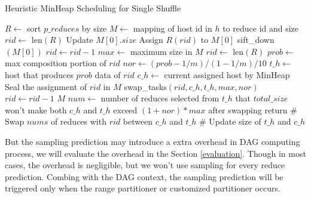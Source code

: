\begin{minipage}{\linewidth}
\begin{algorithm}[H]
\caption{Heuristic MinHeap Scheduling for Single Shuffle}
\label{hminheap}
	\begin{algorithmic}[1]
	\small
		\State $R\gets$ sort $p\_reduces$ by size
		\State $M\gets$ mapping of host id in $h$ to reduce id and size
		\State $rid\gets$ len$\left(R\right)$
		\State Update $M\left[0\right].size$
		\State Assign $R\left(rid\right)$ to $M\left[0\right]$
		\State sift\_down$\left(M\left[0\right]\right)$
		\State
		\State $rid\gets rid-1$
		\EndWhile
		\State $max\gets$ maximum size in $M$
		\State $rid\gets$ len$\left(R\right)$
		\State $prob\gets$ max composition portion of $rid$
		\State $nor\gets \left(prob-1/m\right)/\left(1-1/m\right)/10$
		\State
		\State $t\_h\gets$ host that produces $prob$ data of $rid$
		\State $c\_h\gets$ current assigned host by MinHeap
			\State Seal the assignment of $rid$ in $M$
		\Else
			\State swap\_tasks$\left(rid, c\_h, t\_h, max, nor\right)$
		\EndIf
		\State $rid\gets rid-1$
		\EndWhile
		\Return $M$
	\EndProcedure
	\State $num\gets$ number of reduces 
	\State selected from $t\_h$ that $total\_size$ won't
	\State make both $c\_h$ and $t\_h$ exceed $\left(1+nor\right)*max$
	\State after swapping
		\State return
	\Else
		\State \# Swap $nums$ of reduces with $rid$ between $c\_h$ and $t\_h$
		\State \# Update size of $t\_h$ and $c\_h$
	\EndIf
	\EndProcedure
	\end{algorithmic}
\end{algorithm}
\end{minipage}

But the sampling prediction may introduce a extra overhead in DAG computing process, we will evaluate the overhead in the Section \ref{evaluation}. Though in most cases, the overhead is negligible, but we won't use sampling for every reduce prediction. Combing with the DAG context, the sampling prediction will be triggered only when the range partitioner or customized partitioner occurs.

